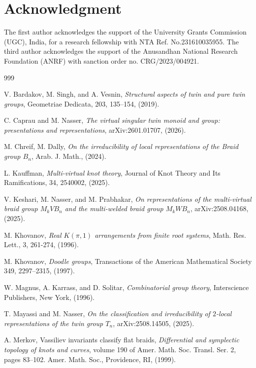 \documentclass[preprint]{elsarticle}
\begin{document}
\section{Acknowledgment}
The first author acknowledges the support of the University Grants Commission
(UGC), India, for a research fellowship with NTA Ref. No.231610035955. The third author acknowledges the support of the Anusandhan National Research
Foundation (ANRF) with sanction order no. CRG/2023/004921.


\begin{thebibliography}{999}

V. Bardakov, M. Singh, and A. Vesnin, \textit{Structural aspects of twin and pure twin groups}, Geometriae Dedicata, 203, 135--154, (2019).

C. Caprau and M. Nasser, \textit{The virtual singular twin monoid and group: presentations and representations}, arXiv:2601.01707, (2026).

 M. Chreif, M. Dally, \emph{On the irreducibility of local representations of the Braid group $B_n$}, {Arab. J. Math.}, (2024).

L. Kauffman, \textit{Multi-virtual knot theory}, Journal of Knot Theory and Its Ramifications, 34, 2540002, (2025).

V. Keshari, M. Nasser, and M. Prabhakar, \textit{On representations of the multi-virtual braid group $M_kVB_n$ and the multi-welded braid group $M_kWB_n$}, arXiv:2508.04168, (2025).

 M. Khovanov, \emph{Real $K(\pi,1)$ arrangements from finite root systems}, {Math. Res. Lett.}, 3, 261-274, (1996).

M. Khovanov, \textit{Doodle groups}, Transactions of the American Mathematical Society 349, 2297--2315, (1997).

W. Magnus, A. Karrass, and D. Solitar, \textit{Combinatorial group theory}, Interscience Publishers, New York, (1996).

 T. Mayassi and M. Nasser, \emph{On the classification and irreducibility of $2$-local representations of the twin group $T_n$}, {arXiv:2508.14505}, (2025).

 A. Merkov, Vassiliev invariants classify flat braids, \emph{Differential and symplectic topology of knots and curves}, volume 190 of Amer. Math. Soc. Transl. Ser. 2, pages 83–102. Amer. Math. Soc., Providence, RI, (1999).


\end{thebibliography}
\end{document}
